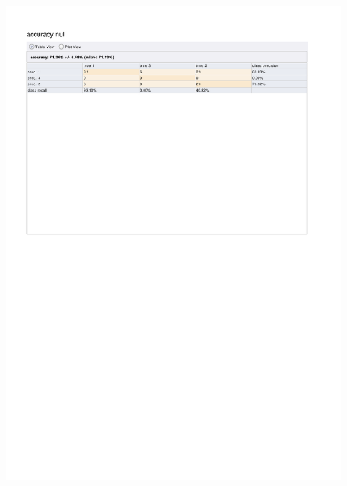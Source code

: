 \begin{figure}[htp]
  \centerline{\includegraphics[trim=0 680 0 80,clip,width=16.09cm]{results/ANN_A_Relaxation.pdf}} \caption{
} \label{ANN_K_Relaxation}
\end{figure}

